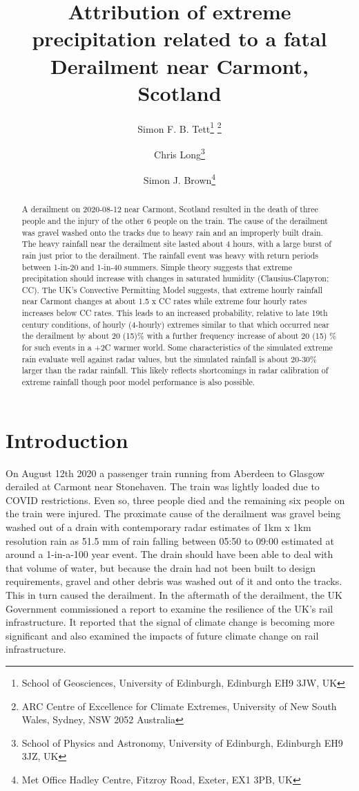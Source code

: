 \documentclass[11pt,a4paper]{article}
\title{Attribution of extreme precipitation related to a fatal Derailment  near Carmont, Scotland}
\author{Simon F. B. Tett\thanks{School of Geosciences, University of Edinburgh, Edinburgh EH9 3JW, UK} \thanks{ARC Centre of Excellence for Climate Extremes,
University of New South Wales,
Sydney, NSW 2052 Australia}
	\and 
Chris Long\thanks{School of Physics and Astronomy, University of Edinburgh, Edinburgh EH9 3JZ, UK}
\and 
Simon J. Brown\thanks{Met Office Hadley Centre, Fitzroy Road, Exeter, EX1 3PB, UK}}
\begin{document}
	
\maketitle

\graphicspath{{../figures/}}


\begin{abstract}
	A derailment on 2020-08-12 near Carmont, Scotland resulted in the death of three people and the injury of the other 6 people on the train. The cause of the derailment was gravel washed onto the tracks due to heavy rain and an improperly built drain.  The heavy rainfall near the derailment site lasted about 4 hours, with a large burst of  rain just prior to the derailment. The rainfall event was heavy with return  periods between 1-in-20  and 1-in-40 summers. Simple theory suggests that extreme precipitation should increase with changes in saturated humidity (Clausius-Clapyron; CC). The UK's Convective Permitting Model suggests, that extreme hourly rainfall near Carmont changes at  about 1.5 x CC rates while extreme four hourly rates increases below  CC rates. This leads to an increased probability, relative to late 19th century conditions,  of hourly (4-hourly) extremes similar to that which occurred near the derailment by about 20 (15)\% with a further frequency increase of about 20 (15)  \% for such events in a +2C warmer world. Some characteristics of the simulated extreme rain evaluate well against radar values, but the  simulated rainfall is about 20-30\% larger than the radar rainfall. This likely reflects shortcomings in  radar  calibration of extreme rainfall though poor  model performance is also possible. 
\end{abstract}



\section{Introduction}
\label{sect:Intro}

On August 12th 2020 a passenger train running from Aberdeen to Glasgow derailed at Carmont near Stonehaven. The train was lightly loaded due to COVID restrictions. Even so,  three people died and the remaining six people on the train  were injured. The proximate cause of the derailment was gravel being washed out of a drain with contemporary radar estimates of 1km x 1km resolution rain as 51.5 mm of rain falling between 05:50 to 09:00  estimated at around a 1-in-a-100 year event\parencite{carmontReport2024}. The drain should have been able to deal with that volume of water, but because the drain had not been built to design requirements, gravel and other debris was washed out of it and onto the tracks. This in turn caused the derailment. In the aftermath of the derailment, the UK Government commissioned a report to examine the resilience of the UK's rail infrastructure\parencite{NR_DfT_2021}. It reported that the signal of climate change is becoming more significant and also examined the impacts of future climate change  on rail infrastructure.
\end{document}

